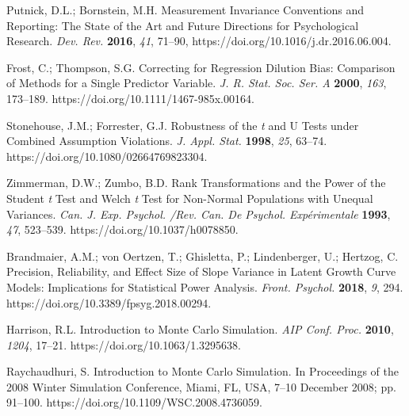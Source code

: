 \documentclass[psych,tutorial,accept,moreauthors,pdftex]{Definitions/mdpi}
\begin{document}
\begin{thebibliography}{999}
Putnick, D.L.; Bornstein, M.H. Measurement Invariance Conventions and Reporting: The State of the Art and Future Directions for Psychological Research. \emph{Dev. Rev.} \textbf{2016}, \emph{41}, 71--90, https://doi.org/10.1016/j.dr.2016.06.004.


Frost, C.; Thompson, S.G. Correcting for Regression Dilution Bias: Comparison of Methods for a Single Predictor Variable. \emph{J. R. Stat. Soc. Ser. A} \textbf{2000}, \emph{163}, 173--189. https://doi.org/10.1111/1467-985x.00164.

Stonehouse, J.M.; Forrester, G.J. Robustness of the \emph{t} and U Tests under Combined Assumption Violations. \emph{J. Appl. Stat.} \textbf{1998}, \emph{25}, 63--74. https://doi.org/10.1080/02664769823304.

Zimmerman, D.W.; Zumbo, B.D. Rank Transformations and the Power of the Student \emph{t} Test and Welch \emph{t} Test for Non-Normal Populations with Unequal Variances. \emph{Can. J. Exp. Psychol. /Rev. Can. De Psychol. Expérimentale} \textbf{1993}, \emph{47}, 523--539. https://doi.org/10.1037/h0078850.

Brandmaier, A.M.; von Oertzen, T.; Ghisletta, P.; Lindenberger, U.; Hertzog, C. Precision, Reliability, and Effect Size of Slope Variance in Latent Growth Curve Models: Implications for Statistical Power Analysis. \emph{Front. Psychol.} \textbf{2018}, \emph{9}, 294. https://doi.org/10.3389/fpsyg.2018.00294.


Harrison, R.L. Introduction to Monte Carlo Simulation. \emph{AIP Conf. Proc.} \textbf{2010}, \emph{1204}, 17--21. https://doi.org/10.1063/1.3295638.


Raychaudhuri, S. Introduction to Monte Carlo Simulation. In Proceedings of the 2008 Winter Simulation Conference, Miami, FL, USA, 7--10 December 2008; pp. 91--100. https://doi.org/10.1109/WSC.2008.4736059.



\end{thebibliography}
\end{document}
